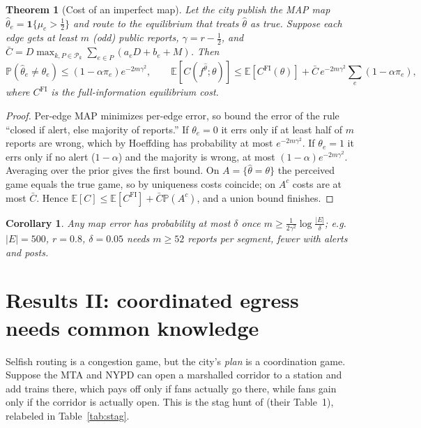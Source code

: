 \documentclass[11pt]{article}
\newtheorem{theorem}{Theorem}
\newtheorem{corollary}{Corollary}
\theoremstyle{definition}
\theoremstyle{remark}
\newcommand{\E}{\mathbb{E}}
\renewcommand{\Pr}{\mathbb{P}}
\newcommand{\1}{\mathbf{1}}
\begin{document}
\begin{theorem}[Cost of an imperfect map]\label{thm:conc}
Let the city publish the MAP map $\hat\theta_e=\1\{\mu_e>\tfrac12\}$ and route
to the equilibrium that treats $\hat\theta$ as true. Suppose each edge gets
at least $m$ (odd) public reports, $\gamma=r-\tfrac12$, and
$\bar C=D\max_{k,P\in\mathcal P_k}\sum_{e\in P}(a_eD+b_e+M)$. Then
\[
\Pr(\hat\theta_e\ne\theta_e)\le(1-\alpha\pi_e)e^{-2m\gamma^2},
\qquad
\E[C(f^{\hat\theta};\theta)]\le\E[C^{\mathrm{FI}}(\theta)]
+\bar C\,e^{-2m\gamma^2}\textstyle\sum_e(1-\alpha\pi_e),
\]
where $C^{\mathrm{FI}}$ is the full-information equilibrium cost.
\end{theorem}

\begin{proof}
Per-edge MAP minimizes per-edge error, so bound the error of the rule
``closed if alert, else majority of reports.'' If $\theta_e=0$ it errs only
if at least half of $m$ reports are wrong, which by Hoeffding has
probability at most $e^{-2m\gamma^2}$. If $\theta_e=1$ it errs only if no
alert ($1-\alpha$) and the majority is wrong, at most
$(1-\alpha)e^{-2m\gamma^2}$. Averaging over the prior gives the first bound.
On $A=\{\hat\theta=\theta\}$ the perceived game equals the true game, so by
uniqueness costs coincide; on $A^c$ costs are at most $\bar C$. Hence
$\E[C]\le\E[C^{\mathrm{FI}}]+\bar C\Pr(A^c)$, and a union bound finishes.
\end{proof}

\begin{corollary}
Any map error has probability at most $\delta$ once
$m\ge\frac{1}{2\gamma^2}\log\frac{|E|}{\delta}$; e.g.\ $|E|=500$,
$r=0.8$, $\delta=0.05$ needs $m\ge52$ reports per segment, fewer with
alerts and posts.
\end{corollary}

\section{Results II: coordinated egress needs common knowledge}

Selfish routing is a congestion game, but the city's \emph{plan} is a
coordination game. Suppose the MTA and NYPD can open a marshalled corridor
to a station and add trains there, which pays off only if fans actually go
there, while fans gain only if the corridor is actually open. This is the
stag hunt of \cite{dfp} (their Table~1), relabeled in Table~\ref{tab:stag}.
\end{document}
